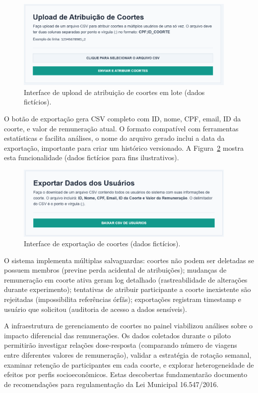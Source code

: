 \begin{figure}[H]
    \centering
    \includegraphics[width=0.95\textwidth]{figuras/upload_coortes.PNG}
    \caption{Interface de upload de atribuição de coortes em lote (dados fictícios).}
    \label{fig:coortes_listagem_upload}
  \end{figure}

O botão de exportação gera CSV completo com ID, nome, CPF, email, ID da coorte, e valor de remuneração atual. O formato compatível com ferramentas estatísticas e facilita análises, o nome do arquivo gerado inclui a data da exportação, importante para criar um histórico versionado. A Figura~\ref{fig:coortes_listagem_exportar} mostra esta funcionalidade (dados fictícios para fins ilustrativos).

\begin{figure}[H]
    \centering
    \includegraphics[width=0.95\textwidth]{figuras/exportar_coortes.PNG}
    \caption{Interface de exportação de coortes (dados fictícios).}
    \label{fig:coortes_listagem_exportar}
  \end{figure}

O sistema implementa múltiplas salvaguardas: coortes não podem ser deletadas se possuem membros (previne perda acidental de atribuições); mudanças de remuneração em coorte ativa geram log detalhado (rastreabilidade de alterações durante experimento); tentativas de atribuir participante a coorte inexistente são rejeitadas (impossibilita referências órfãs); exportações registram timestamp e usuário que solicitou (auditoria de acesso a dados sensíveis).

A infraestrutura de gerenciamento de coortes no painel viabilizou análises sobre o impacto diferencial das remunerações. Os dados coletados durante o piloto permitirão investigar relações dose-resposta (comparando número de viagens entre diferentes valores de remuneração), validar a estratégia de rotação semanal, examinar retenção de participantes em cada coorte, e explorar heterogeneidade de efeitos por perfis socioeconômicos. Estas descobertas fundamentarão documento de recomendações para regulamentação da Lei Municipal 16.547/2016.


